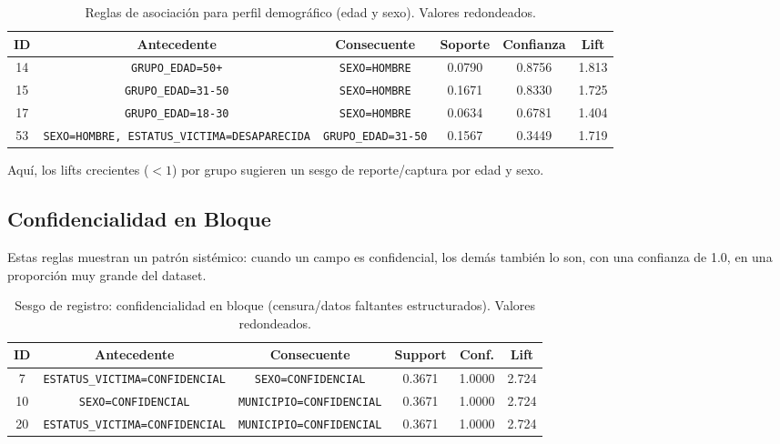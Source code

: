 \begin{table}[H]
\centering
\small
\begin{tabular}{cccccc}
\hline
ID & Antecedente & Consecuente & Soporte & Confianza & Lift \\
\hline
14 & \texttt{GRUPO\_EDAD=50+} & \texttt{SEXO=HOMBRE} & 0.0790 & 0.8756 & 1.813 \\
15 & \texttt{GRUPO\_EDAD=31-50} & \texttt{SEXO=HOMBRE} & 0.1671 & 0.8330 & 1.725 \\
17 & \texttt{GRUPO\_EDAD=18-30} & \texttt{SEXO=HOMBRE} & 0.0634 & 0.6781 & 1.404 \\
53 & \texttt{SEXO=HOMBRE, ESTATUS\_VICTIMA=DESAPARECIDA} & \texttt{GRUPO\_EDAD=31-50} & 0.1567 & 0.3449 & 1.719 \\
\hline
\end{tabular}
\caption{Reglas de asociación para perfil demográfico (edad y sexo). Valores redondeados.}
\label{tab:perfil_demografico}
\end{table}

Aquí, los lifts crecientes ($<1$) por grupo sugieren un sesgo de reporte/captura por edad y sexo.

\subsection{Confidencialidad en Bloque}

Estas reglas muestran un patrón sistémico: cuando un campo es confidencial, los demás también lo son, con una confianza
de 1.0, en una proporción muy grande del dataset.

\begin{table}[htbp]
\centering
\small
\begin{tabular}{cccccc}
\hline
ID & Antecedente & Consecuente & Support & Conf. & Lift \\
\hline
7  & \texttt{ESTATUS\_VICTIMA=CONFIDENCIAL} & \texttt{SEXO=CONFIDENCIAL} & 0.3671 & 1.0000 & 2.724 \\
10 & \texttt{SEXO=CONFIDENCIAL} & \texttt{MUNICIPIO=CONFIDENCIAL} & 0.3671 & 1.0000 & 2.724 \\
20 & \texttt{ESTATUS\_VICTIMA=CONFIDENCIAL} & \texttt{MUNICIPIO=CONFIDENCIAL} & 0.3671 & 1.0000 & 2.724 \\
\hline
\end{tabular}
\caption{Sesgo de registro: confidencialidad en bloque (censura/datos faltantes estructurados). Valores redondeados.}
\label{tab:confidencialidad_bloque}
\end{table}

